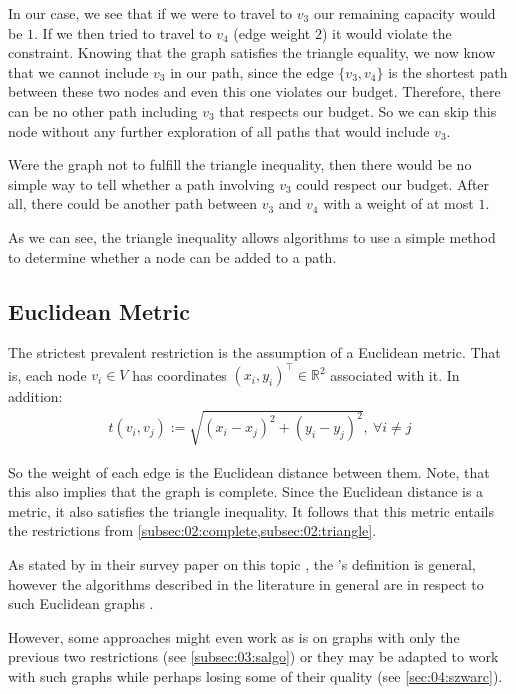 In our case, we see that if we were to travel to $v_3$ our remaining capacity would be $1$.
If we then tried to travel to $v_4$ (edge weight $2$) it would violate the constraint.
Knowing that the graph satisfies the triangle equality, we now know that we cannot include $v_3$ in our path, since the edge $\{v_3, v_4\}$ is the shortest path between these two nodes and even this one violates our budget.
Therefore, there can be no other path including $v_3$ that respects our budget.
So we can skip this node without any further exploration of all paths that would include $v_3$.

Were the graph not to fulfill the triangle inequality, then there would be no simple way to tell whether a path involving $v_3$ could respect our budget.
After all, there could be another path between $v_3$ and $v_4$ with a weight of at most $1$.

As we can see, the triangle inequality allows algorithms to use a simple method to determine whether a node can be added to a path.

\subsection{Euclidean Metric}
\label{subsec:02:euclidean}

The strictest prevalent restriction is the assumption of a Euclidean metric.
That is, each node $v_i \in V$ has coordinates $(x_i, y_i)^\intercal \in \mathbb{R}^2$ associated with it.
In addition:
\begin{align*}
	t(v_i,v_j) := \sqrt{(x_i - x_j)^2 + (y_i - y_j)^2},\ \forall i \neq j
\end{align*}

So the weight of each edge is the Euclidean distance between them. Note, that this also implies that the graph is complete.
Since the Euclidean distance is a metric, it also satisfies the triangle inequality.
It follows that this metric entails the restrictions from \cref{subsec:02:complete,subsec:02:triangle}.

As stated by \citeauthor{vansteenwegen_orienteering_2011} in their survey paper on this topic \cite{vansteenwegen_orienteering_2011}, the \op{}'s definition is general, however the algorithms described in the literature in general are in respect to such Euclidean graphs \cite{golden_orienteering_1987,tsiligiridis_heuristic_1984,szwarc_novel_2022,geem_harmony_2005}.

However, some approaches might even work as is on graphs with only the previous two restrictions (see \cref{subsec:03:salgo}) or they may be adapted to work with such graphs while perhaps losing some of their quality (see \cref{sec:04:szwarc}).

